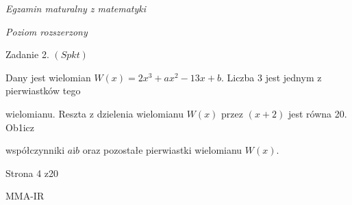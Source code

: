 \documentclass[a4paper,12pt]{article}
\begin{document}
{\it Egzamin maturalny z matematyki}

{\it Poziom rozszerzony}

Zadanie 2. $(Spkt)$

Dany jest wielomian $W(x)=2x^{3}+ax^{2}-13x+b$. Liczba 3 jest jednym z pierwiastków tego

wielomianu. Reszta z dzielenia wielomianu $W(x)$ przez $(x+2)$ jest równa 20. Ob1icz

współczynniki $a\mathrm{i}b$ oraz pozostałe pierwiastki wielomianu $W(x).$

Strona 4 z20

MMA-IR
\end{document}
